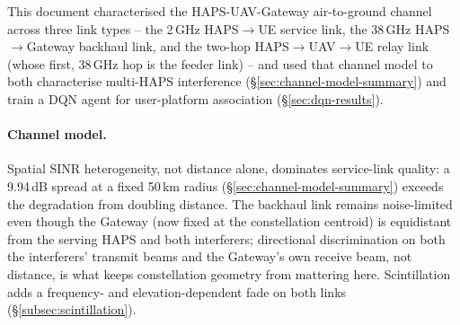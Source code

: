 \documentclass[conference]{IEEEtran}
\begin{document}
This document characterised the HAPS-UAV-Gateway air-to-ground channel
across three link types -- the 2\,GHz HAPS$\rightarrow$UE service link,
the 38\,GHz HAPS$\rightarrow$Gateway backhaul link, and the two-hop
HAPS$\rightarrow$UAV$\rightarrow$UE relay link (whose first, 38\,GHz hop is
the feeder link) -- and used that channel
model to both characterise multi-HAPS interference (\S\ref{sec:channel-model-summary})
and train a DQN agent for user-platform association (\S\ref{sec:dqn-results}).

\paragraph{Channel model.} Spatial SINR heterogeneity, not distance alone,
dominates service-link quality: a 9.94\,dB spread at a fixed 50\,km radius
(\S\ref{sec:channel-model-summary}) exceeds the degradation from doubling distance.
The backhaul link remains noise-limited even though the Gateway (now fixed at the
constellation centroid) is equidistant from the serving HAPS and both interferers;
directional discrimination on both the interferers' transmit beams and the Gateway's own
receive beam, not distance, is what keeps constellation geometry from mattering here.
Scintillation adds a frequency- and elevation-dependent
fade on both links (\S\ref{subsec:scintillation}).
\end{document}
